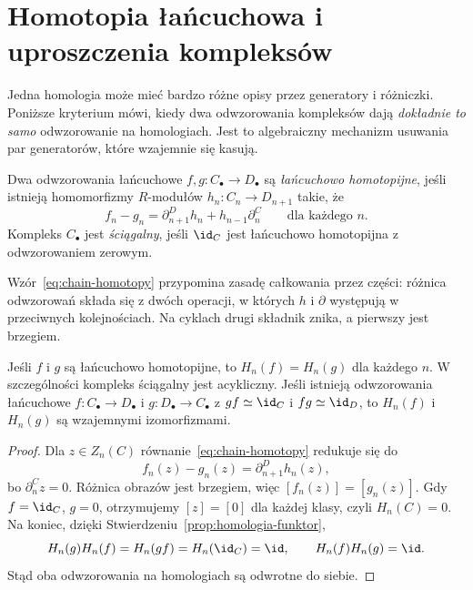 \section{Homotopia łańcuchowa i uproszczenia kompleksów}
\label{sec:homotopia-lancuchowa}

Jedna homologia może mieć bardzo różne opisy
przez generatory i różniczki. Poniższe kryterium
mówi, kiedy dwa odwzorowania kompleksów dają
\emph{dokładnie to samo} odwzorowanie na
homologiach. Jest to algebraiczny mechanizm
usuwania par generatorów, które wzajemnie
się kasują.

\begin{definicja}
\label{def:homotopia-lancuchowa}
Dwa odwzorowania łańcuchowe $f,g:C_\bullet\to D_\bullet$
są \emph{łańcuchowo homotopijne}, jeśli istnieją
homomorfizmy $R$-modułów $h_n:C_n\to D_{n+1}$ takie, że
\begin{equation}\label{eq:chain-homotopy}
 f_n-g_n=\partial^D_{n+1}h_n+h_{n-1}\partial^C_n
 \qquad\text{dla każdego }n.
\end{equation}
Kompleks $C_\bullet$ jest \emph{ściągalny},
jeśli $\id_C$ jest łańcuchowo homotopijna
z odwzorowaniem zerowym.
\end{definicja}

Wzór~\eqref{eq:chain-homotopy} przypomina
zasadę całkowania przez części: różnica
odwzorowań składa się z dwóch operacji, w których
$h$ i $\partial$ występują w przeciwnych
kolejnościach. Na cyklach drugi składnik
znika, a pierwszy jest brzegiem.

\begin{twierdzenie}
\label{thm:homotopia-homologia}
Jeśli $f$ i $g$ są łańcuchowo homotopijne,
to $H_n(f)=H_n(g)$ dla każdego $n$.
W szczególności kompleks ściągalny jest
acykliczny. Jeśli istnieją odwzorowania łańcuchowe
$f:C_\bullet\to D_\bullet$ i
$g:D_\bullet\to C_\bullet$ z
$gf\simeq\id_C$ i $fg\simeq\id_D$,
to $H_n(f)$ i $H_n(g)$ są wzajemnymi
izomorfizmami.
\end{twierdzenie}
\begin{proof}
Dla $z\in Z_n(C)$ równanie~\eqref{eq:chain-homotopy}
redukuje się do
\[
 f_n(z)-g_n(z)=\partial^D_{n+1}h_n(z),
\]
bo $\partial^C_nz=0$. Różnica obrazów jest
brzegiem, więc $[f_n(z)]=[g_n(z)]$.
Gdy $f=\id_C$, $g=0$, otrzymujemy
$[z]=[0]$ dla każdej klasy, czyli
$H_n(C)=0$.
Na koniec, dzięki
Stwierdzeniu~\ref{prop:homologia-funktor},
\[
 H_n(g)H_n(f)=H_n(gf)
 =H_n(\id_C)=\id,\qquad
 H_n(f)H_n(g)=\id.
\]
Stąd oba odwzorowania na homologiach są
odwrotne do siebie.
\end{proof}

